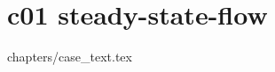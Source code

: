 %
%
\chapter{c01 steady-state-flow}
\graphicspath{{../c01_steady-state-flow/doc/}}
{chapters/case_text.tex}
%
